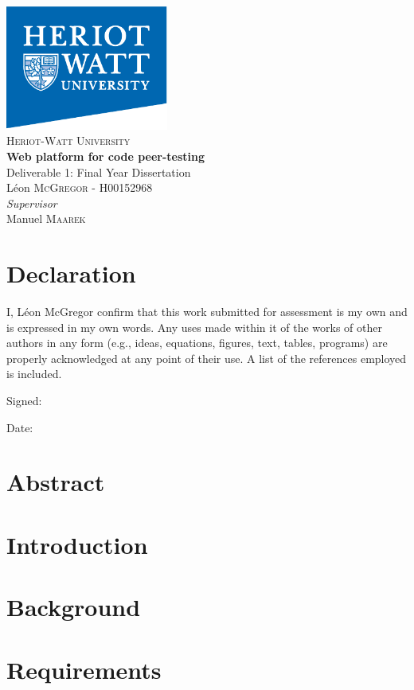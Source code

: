 \documentclass[a4paper,11pt]{article}
\newcommand{\titles}{\\\vspace{1cm}}
\begin{document}
{\centering\Large
\includegraphics[width=0.4\textwidth]{hwlogo}\titles
{\scshape\LARGE Heriot-Watt University\titles}
{\huge\bfseries Web platform for code peer-testing\titles}
Deliverable 1: Final Year Dissertation\titles
L\'eon \textsc{McGregor} - H00152968\titles
{\large\textit{Supervisor}\\}
Manuel \textsc{Maarek}\\
\vfill
}

\pagebreak

\tableofcontents

\pagestyle{headings}

\pagebreak
\doublespacing

\section*{Declaration}
I, L\'eon McGregor confirm that this work submitted for assessment is my own and is expressed in my own words. Any uses made within it of the works of other authors in any form (e.g., ideas, equations, figures, text, tables, programs) are properly acknowledged at any point of their use. A list of the references employed is included.\par
Signed: \par
Date: 

\section{Abstract}

\section{Introduction}

\section{Background}

\section{Requirements}
\end{document}
